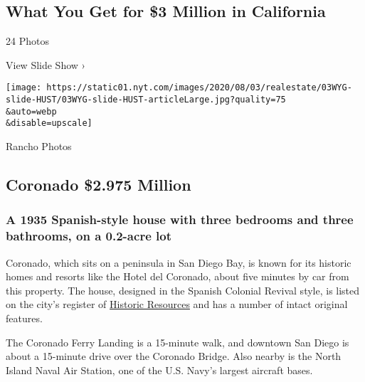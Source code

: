 \href{https://www.nytimes.com/slideshow/2020/08/03/realestate/what-you-get-for-3-million-in-california.html}{}

\hypertarget{what-you-get-for-3-million-in-california}{%
\subsection{What You Get for \$3 Million in
California}\label{what-you-get-for-3-million-in-california}}

24 Photos

View Slide Show ›

\texttt{[image: https://static01.nyt.com/images/2020/08/03/realestate/03WYG-slide-HUST/03WYG-slide-HUST-articleLarge.jpg?quality=75\\\&auto=webp\\\&disable=upscale]}

Rancho Photos

\hypertarget{coronado--2975-million}{%
\subsection{Coronado \textbar{} \$2.975
Million}\label{coronado--2975-million}}

\hypertarget{a-1935-spanish-style-house-with-three-bedrooms-and-three-bathrooms-on-a-02-acre-lot}{%
\subsubsection{\texorpdfstring{\textbf{A 1935 Spanish-style house with
three bedrooms and three bathrooms, on a 0.2-acre
lot}}{A 1935 Spanish-style house with three bedrooms and three bathrooms, on a 0.2-acre lot}}\label{a-1935-spanish-style-house-with-three-bedrooms-and-three-bathrooms-on-a-02-acre-lot}}

Coronado, which sits on a peninsula in San Diego Bay, is known for its
historic homes and resorts like the Hotel del Coronado, about five
minutes by car from this property. The house, designed in the Spanish
Colonial Revival style, is listed on the city's register of
\href{https://www.coronado.ca.us/UserFiles/Servers/Server_746006/File/government/departments/comm\%20dev/Coronado\%20Register\%20tri-fold_May\%202016.pdf}{Historic
Resources} and has a number of intact original features.

The Coronado Ferry Landing is a 15-minute walk, and downtown San Diego
is about a 15-minute drive over the Coronado Bridge. Also nearby is the
North Island Naval Air Station, one of the U.S. Navy's largest aircraft
bases.

